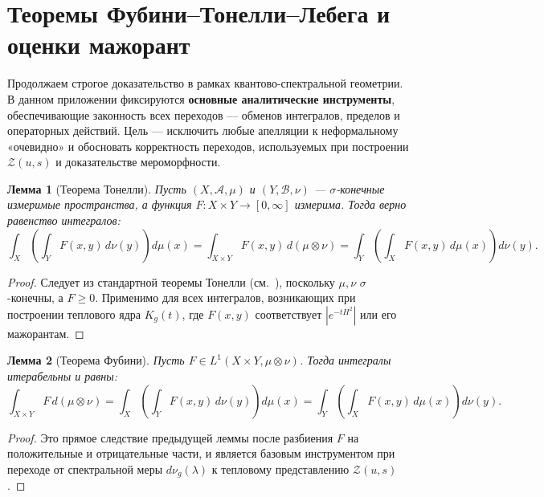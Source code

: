 \documentclass{article}
\numberwithin{equation}{section}
\theoremstyle{plain}
\newtheorem{lemma}{Лемма}
\theoremstyle{definition}
\theoremstyle{remark}
\def\infty{∞}\def\partial{∂}\def\sum{Σ}\def\int{∫}%
\begin{document}
\clearpage

\section{Теоремы Фубини–Тонелли–Лебега и оценки мажорант}


\noindent
Продолжаем строгое доказательство в рамках квантово-спектральной геометрии.  
В данном приложении фиксируются \textbf{основные аналитические инструменты}, обеспечивающие законность всех переходов — обменов интегралов, пределов и операторных действий.  
Цель — исключить любые апелляции к неформальному «очевидно» и обосновать корректность переходов, используемых при построении $\mathcal Z(u,s)$ и доказательстве мероморфности.


\begin{lemma}[Теорема Тонелли]
\label{lemma:tonelli}
Пусть $(X,\mathcal A,\mu)$ и $(Y,\mathcal B,\nu)$ — $\sigma$-конечные измеримые пространства,  
а функция $F:X\times Y\to[0,\infty]$ измерима.  
Тогда верно равенство интегралов:
\begin{equation}
\int_X\!\!\left(\int_Y F(x,y)\,d\nu(y)\right)d\mu(x)
= \int_{X\times Y} F(x,y)\,d(\mu\otimes\nu)
= \int_Y\!\!\left(\int_X F(x,y)\,d\mu(x)\right)d\nu(y).
\end{equation}
\end{lemma}

\begin{proof}
Следует из стандартной теоремы Тонелли (см.~\cite{Folland1999}),  
поскольку $\mu,\nu$ $\sigma$-конечны, а $F\ge0$.  
Применимо для всех интегралов, возникающих при построении теплового ядра $K_g(t)$, где $F(x,y)$ соответствует $|e^{-tH^2}|$ или его мажорантам.
\end{proof}

\begin{lemma}[Теорема Фубини]
\label{lemma:fubini}
Пусть $F\in L^1(X\times Y,\mu\otimes\nu)$.  
Тогда интегралы итерабельны и равны:
\begin{equation}
\int_{X\times Y} F\,d(\mu\otimes\nu)
= \int_X\!\!\left(\int_Y F(x,y)\,d\nu(y)\right)d\mu(x)
= \int_Y\!\!\left(\int_X F(x,y)\,d\mu(x)\right)d\nu(y).
\end{equation}
\end{lemma}

\begin{proof}
Это прямое следствие предыдущей леммы после разбиения $F$ на положительные и отрицательные части, и является базовым инструментом при переходе от спектральной меры $d\nu_g(\lambda)$ к тепловому представлению $\mathcal Z(u,s)$.
\end{proof}
\end{document}
